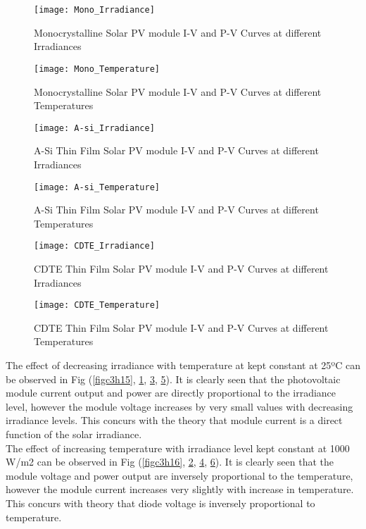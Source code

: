 \begin{figure}[H]
\centering
\texttt{[image: Mono\_Irradiance]}
\caption{Monocrystalline Solar PV module I-V and P-V Curves at different Irradiances}
\label{figc3h17} %
\end{figure}

\begin{figure}[H]
\centering
\texttt{[image: Mono\_Temperature]}
\caption{Monocrystalline Solar PV module I-V and P-V Curves at different Temperatures}
\label{figc3h18} %
\end{figure}

\begin{figure}[H]
\centering
\texttt{[image: A-si\_Irradiance]}
\caption{A-Si Thin Film Solar PV module I-V and P-V Curves at different Irradiances}
\label{figc3h19} %
\end{figure}

\begin{figure}[H]
\centering
\texttt{[image: A-si\_Temperature]}
\caption{A-Si Thin Film Solar PV module I-V and P-V Curves at different Temperatures}
\label{figc3h20} %
\end{figure}

\begin{figure}[H]
\centering
\texttt{[image: CDTE\_Irradiance]}
\caption{CDTE Thin Film Solar PV module I-V and P-V Curves at different Irradiances}
\label{figc3h21} %
\end{figure}

\begin{figure}[H]
\centering
\texttt{[image: CDTE\_Temperature]}
\caption{CDTE Thin Film Solar PV module I-V and P-V Curves at different Temperatures}
\label{figc3h22} %
\end{figure}
The effect of decreasing irradiance with temperature at kept constant at 25ºC can be observed in Fig (\ref{figc3h15}, \ref{figc3h17}, \ref{figc3h19}, \ref{figc3h21}). It is clearly seen that the photovoltaic module current output and power are directly proportional to the irradiance level, however the module voltage increases by very small values with decreasing irradiance levels. This concurs with the theory that module current is a direct function of the solar irradiance.\\

The effect of increasing temperature with irradiance level kept constant at 1000 W/m2 can be observed in Fig (\ref{figc3h16}, \ref{figc3h18}, \ref{figc3h20}, \ref{figc3h22}). It is clearly seen that the module voltage and power output are inversely proportional to the temperature, however the module current increases very slightly with increase in temperature. This concurs with theory that diode voltage is inversely proportional to temperature.

